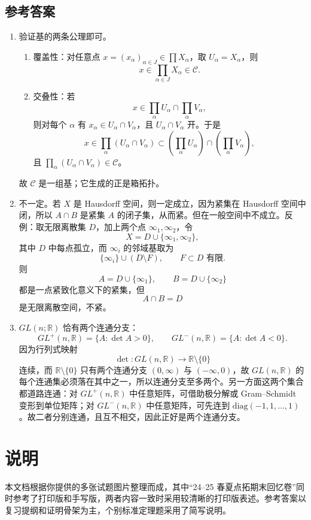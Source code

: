 \documentclass{article}
\newcommand{\R}{\mathbb{R}}
\begin{document}
\subsection*{参考答案}

\begin{enumerate}
  \item 验证基的两条公理即可。
        \begin{enumerate}
          \item 覆盖性：对任意点 $x=(x_\alpha)_{\alpha\in J}\in\prod X_\alpha$，取 $U_\alpha=X_\alpha$，则
                \[
                  x\in \prod_{\alpha\in J}X_\alpha\in\mathcal C.
                \]
          \item 交叠性：若
                \[
                  x\in \prod_{\alpha}U_\alpha\cap\prod_{\alpha}V_\alpha,
                \]
                则对每个 $\alpha$ 有 $x_\alpha\in U_\alpha\cap V_\alpha$，且 $U_\alpha\cap V_\alpha$ 开。于是
                \[
                  x\in \prod_{\alpha}(U_\alpha\cap V_\alpha)\subset
                  \left(\prod_{\alpha}U_\alpha\right)\cap
                  \left(\prod_{\alpha}V_\alpha\right),
                \]
                且 $\prod_{\alpha}(U_\alpha\cap V_\alpha)\in\mathcal C$。
        \end{enumerate}
        故 $\mathcal C$ 是一组基；它生成的正是箱拓扑。

  \item 不一定。若 $X$ 是 Hausdorff 空间，则一定成立，因为紧集在 Hausdorff 空间中闭，所以 $A\cap B$ 是紧集 $A$ 的闭子集，从而紧。但在一般空间中不成立。反例：取无限离散集 $D$，加上两个点 $\infty_1,\infty_2$，令
        \[
          X=D\cup\{\infty_1,\infty_2\},
        \]
        其中 $D$ 中每点孤立，而 $\infty_i$ 的邻域基取为
        \[
          \{\infty_i\}\cup(D\setminus F),\qquad F\subset D\text{ 有限}.
        \]
        则
        \[
          A=D\cup\{\infty_1\},\qquad B=D\cup\{\infty_2\}
        \]
        都是一点紧致化意义下的紧集，但
        \[
          A\cap B=D
        \]
        是无限离散空间，不紧。

  \item $GL(n;\R)$ 恰有两个连通分支：
        \[
          GL^+(n,\R)=\{A:\det A>0\},\qquad
          GL^-(n,\R)=\{A:\det A<0\}.
        \]
        因为行列式映射
        \[
          \det:GL(n,\R)\to\R\setminus\{0\}
        \]
        连续，而 $\R\setminus\{0\}$ 只有两个连通分支 $(0,\infty)$ 与 $(-\infty,0)$，故 $GL(n,\R)$ 的每个连通集必须落在其中之一，所以连通分支至多两个。另一方面这两个集合都道路连通：对 $GL^+(n,\R)$ 中任意矩阵，可借助极分解或 Gram--Schmidt 变形到单位矩阵；对 $GL^-(n,\R)$ 中任意矩阵，可先连到 $\mathrm{diag}(-1,1,\dots,1)$。故二者分别连通，且互不相交，因此正好是两个连通分支。
\end{enumerate}

\section*{说明}

本文档根据你提供的多张试题图片整理而成，其中“24--25 春夏点拓期末回忆卷”同时参考了打印版和手写版，两者内容一致时采用较清晰的打印版表述。参考答案以复习提纲和证明骨架为主，个别标准定理题采用了简写说明。
\end{document}

